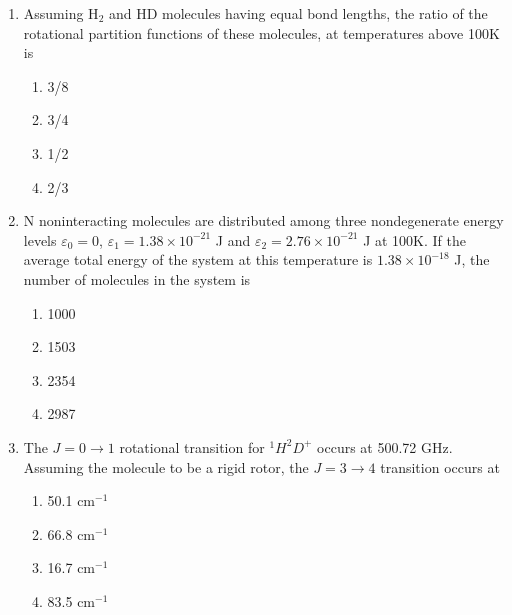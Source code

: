 \documentclass[journal,12pt,onecolumn]{IEEEtran}
\theoremstyle{remark}
\begin{document}
\begin{enumerate}
\item  Assuming H$_2$ and HD molecules having equal bond lengths, the ratio of the rotational partition functions of these molecules, at temperatures above 100K is \hfill{}
\begin{multicols}{2}
\begin{enumerate}[label=(\Alph*)]
    \item 3/8
    \item 3/4
    \item 1/2
    \item 2/3
\end{enumerate}
\end{multicols}

\item  N noninteracting molecules are distributed among three nondegenerate energy levels $\varepsilon_0 = 0$, $\varepsilon_1 = 1.38 \times 10^{-21}$ J and $\varepsilon_2 = 2.76 \times 10^{-21}$ J at 100K. If the average total energy of the system at this temperature is $1.38 \times 10^{-18}$ J, the number of molecules in the system is \hfill{}
\begin{multicols}{2}
\begin{enumerate}[label=(\Alph*)]
    \item 1000
    \item 1503
    \item 2354
    \item 2987
\end{enumerate}
\end{multicols} 
   

\item  The $J = 0 \rightarrow 1$ rotational transition for $^{1}H^{2}D^{+}$ occurs at 500.72 GHz. Assuming the molecule to be a rigid rotor, the $J = 3 \rightarrow 4$ transition occurs at \hfill{}
\begin{multicols}{2}
\begin{enumerate}[label=(\Alph*)]
    \item 50.1 cm$^{-1}$
    \item 66.8 cm$^{-1}$
    \item 16.7 cm$^{-1}$
    \item 83.5 cm$^{-1}$
\end{enumerate}
\end{multicols}



\end{enumerate}
\end{document}
